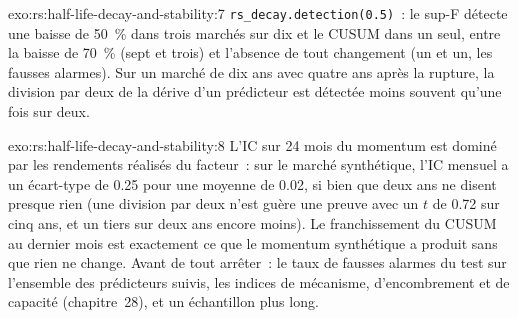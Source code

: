\begin{solution}{exo:rs:half-life-decay-and-stability:7}
\texttt{rs\_decay.detection(0.5)}~: le sup-F détecte une baisse de 50~\% dans trois marchés sur dix et le CUSUM dans un seul, entre la baisse de 70~\% (sept et trois)
et l'absence de tout changement (un et un, les fausses alarmes). Sur un marché de dix ans avec quatre ans après la rupture, la division par deux de la dérive
d'un prédicteur est détectée moins souvent qu'une fois sur deux.
\end{solution}

\begin{solution}{exo:rs:half-life-decay-and-stability:8}
L'IC sur 24 mois du momentum est dominé par les rendements réalisés du facteur~: sur le marché synthétique, l'IC mensuel a un écart-type de 0.25
pour une moyenne de 0.02, si bien que deux ans ne disent presque rien (une division par deux n'est guère une preuve avec un $t$ de 0.72 sur cinq ans, et un tiers sur deux ans
encore moins). Le franchissement du CUSUM au dernier mois est exactement ce que le momentum synthétique a produit sans que rien ne change. Avant de tout arrêter~:
le taux de fausses alarmes du test sur l'ensemble des prédicteurs suivis, les indices de mécanisme, d'encombrement et de capacité (chapitre~28), et un échantillon plus long.
\end{solution}


